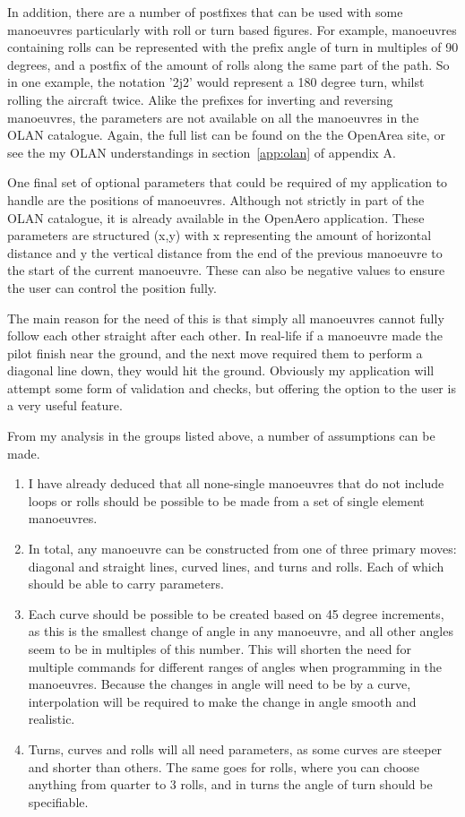 In addition, there are a number of postfixes that can be used with some manoeuvres particularly with roll or turn based figures. For example, manoeuvres containing rolls can be represented with the prefix angle of turn in multiples of 90 degrees, and a postfix of the amount of rolls along the same part of the path. So in one example, the notation '2j2' would represent a 180 degree turn, whilst rolling the aircraft twice. Alike the prefixes for inverting and reversing manoeuvres, the parameters are not available on all the manoeuvres in the OLAN catalogue. Again, the full list can be found on the the OpenArea site, or see the my OLAN understandings in section~\ref{app:olan} of appendix A.

One final set of optional parameters that could be required of my application to handle are the positions of manoeuvres. Although not strictly in part of the OLAN catalogue, it is already available in the OpenAero application. These parameters are structured (x,y) with x representing the amount of horizontal distance and y the vertical distance from the end of the previous manoeuvre to the start of the current manoeuvre. These can also be negative values to ensure the user can control the position fully. 

The main reason for the need of this is that simply all manoeuvres cannot fully follow each other straight after each other. In real-life if a manoeuvre made the pilot finish near the ground, and the next move required them to perform a diagonal line down, they would hit the ground. Obviously my application will attempt some form of validation and checks, but offering the option to the user is a very useful feature.

From my analysis in the groups listed above, a number of assumptions can be made.
\begin{enumerate}
	\item I have already deduced that all none-single manoeuvres that do not include loops or rolls should be possible to be made from a set of single element manoeuvres.
	\item In total, any manoeuvre can be constructed from one of three primary moves: diagonal and straight lines, curved lines, and turns and rolls. Each of which should be able to carry parameters.
	\item Each curve should be possible to be created based on 45 degree increments, as this is the smallest change of angle in any manoeuvre, and all other angles seem to be in multiples of this number. This will shorten the need for multiple commands for different ranges of angles when programming in the manoeuvres. Because the changes in angle will need to be by a curve, interpolation will be required to make the change in angle smooth and realistic.
	\item Turns, curves and rolls will all need parameters, as some curves are steeper and shorter than others. The same goes for rolls, where you can choose anything from quarter to 3 rolls, and in turns the angle of turn should be specifiable.
\end{enumerate}

